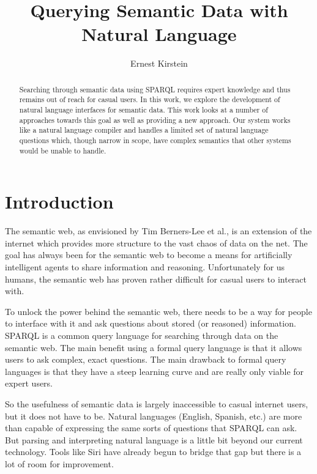 \documentclass[11pt]{article}
\begin{document}
\title{Querying Semantic Data with Natural Language}
\author{Ernest Kirstein}
\maketitle
\clearpage

\tableofcontents
\clearpage

\begin{abstract}
Searching through semantic data using SPARQL requires expert knowledge and thus remains out of reach for casual users. In this work, we explore the development of natural language interfaces for semantic data. This work looks at a number of approaches towards this goal as well as providing a new approach. Our system works like a natural language compiler and handles a limited set of natural language questions which, though narrow in scope, have complex semantics that other systems would be unable to handle.
\end{abstract}
\clearpage

\section{Introduction}
The semantic web, as envisioned by Tim Berners-Lee et al., is an extension of
the internet which provides more structure to the vast chaos of data on the
net. The goal has always been for the semantic web to become a means for 
artificially intelligent agents to share information and reasoning\cite{semantic}.
Unfortunately for us humans, the semantic web has proven rather difficult for
casual users to interact with.

To unlock the power behind the semantic web, there needs to be a way for people
to interface with it and ask questions about stored (or reasoned) information. 
SPARQL is a common query language for searching through data on the 
semantic web\cite{sparql}. The main benefit using a formal query language 
is that it allows users to ask complex, exact questions. 
The main drawback to formal query languages is that
they have a steep learning curve and are really only viable for expert users.

So the usefulness of semantic data is largely inaccessible to casual internet users,
but it does not have to be. Natural languages (English, Spanish, etc.) are more than
capable of expressing the same sorts of questions that SPARQL can ask. But parsing and 
interpreting natural language is a little bit beyond
our current technology. Tools like Siri\cite{siri} have already begun to bridge that
gap but there is a lot of room for improvement. 
\end{document}
